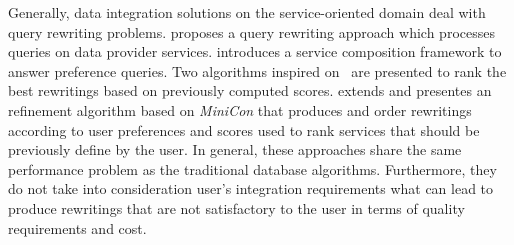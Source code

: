 %
%

%

Generally, data integration solutions on the service-oriented domain deal with
query rewriting problems. \cite{Barhamgi2010} proposes a query rewriting approach which processes queries on data provider services.
%
\cite{Benouaret2011} introduces a service composition framework to answer
preference queries. Two algorithms inspired on~\cite{Barhamgi2010} are presented to rank the best rewritings based on previously computed scores.
%
\cite{ba2014} extends \cite{Umberto} and presentes an refinement algorithm based
on \textit{MiniCon} that produces and order rewritings according to user preferences and scores used to rank services that should be previously define by the user.
In general, these approaches share the same performance problem as the traditional database algorithms. Furthermore, they do not take into consideration user's integration requirements what can lead to produce rewritings that are not satisfactory to the user in terms of quality requirements and cost.

%

